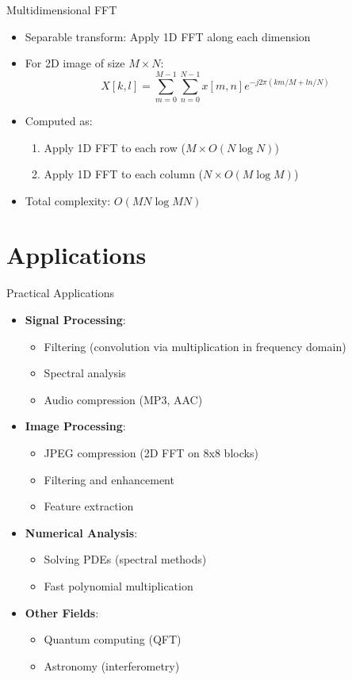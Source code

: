 \documentclass{beamer}
\begin{document}
\begin{frame}{Multidimensional FFT}
  \begin{itemize}
  \item Separable transform: Apply 1D FFT along each dimension
  \item For 2D image of size $M \times N$:
    \[ X[k,l] = \sum_{m=0}^{M-1} \sum_{n=0}^{N-1} x[m,n] e^{-j2\pi (km/M + ln/N)} \]
  \item Computed as:
    \begin{enumerate}
    \item Apply 1D FFT to each row ($M \times O(N \log N)$)
    \item Apply 1D FFT to each column ($N \times O(M \log M)$)
    \end{enumerate}
  \item Total complexity: $O(MN \log MN)$
  \end{itemize}
\end{frame}

\section{Applications}

\begin{frame}{Practical Applications}
  \begin{itemize}
  \item \textbf{Signal Processing}:
    \begin{itemize}
    \item Filtering (convolution via multiplication in frequency domain)
    \item Spectral analysis
    \item Audio compression (MP3, AAC)
    \end{itemize}
  \item \textbf{Image Processing}:
    \begin{itemize}
    \item JPEG compression (2D FFT on 8x8 blocks)
    \item Filtering and enhancement
    \item Feature extraction
    \end{itemize}
  \item \textbf{Numerical Analysis}:
    \begin{itemize}
    \item Solving PDEs (spectral methods)
    \item Fast polynomial multiplication
    \end{itemize}
  \item \textbf{Other Fields}:
    \begin{itemize}
    \item Quantum computing (QFT)
      \item Astronomy (interferometry)
    \end{itemize}
  \end{itemize}
\end{frame}
\end{document}
